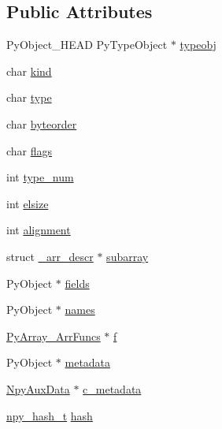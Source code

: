 \subsection*{Public Attributes}
\begin{DoxyCompactItemize}
\item 
Py\+Object\+\_\+\+H\+E\+AD Py\+Type\+Object $\ast$ \hyperlink{struct__PyArray__Descr_a1f3bf03c0bb4733e5a37164b05711433}{typeobj}
\item 
char \hyperlink{struct__PyArray__Descr_a3334dbcd62c0b82b746d78df163f5fe8}{kind}
\item 
char \hyperlink{struct__PyArray__Descr_a7fee62e125b41e0fdb9dec616ea724d4}{type}
\item 
char \hyperlink{struct__PyArray__Descr_a928bedd6abfdb662cc486eb459de8743}{byteorder}
\item 
char \hyperlink{struct__PyArray__Descr_a42b75d020f1e81c1e55aa784d922bb6c}{flags}
\item 
int \hyperlink{struct__PyArray__Descr_a8c77d1daf95cdb46a52b374e614d1e77}{type\+\_\+num}
\item 
int \hyperlink{struct__PyArray__Descr_a9426578c59c17b7dde397bc1d12110c8}{elsize}
\item 
int \hyperlink{struct__PyArray__Descr_a6395d1390bf5a63c117b2bd5bf11e6d6}{alignment}
\item 
struct \hyperlink{struct__arr__descr}{\+\_\+arr\+\_\+descr} $\ast$ \hyperlink{struct__PyArray__Descr_a9021d53dd883c3bb11608508d7296708}{subarray}
\item 
Py\+Object $\ast$ \hyperlink{struct__PyArray__Descr_a558c0b2fa6412603daee6749e69708ef}{fields}
\item 
Py\+Object $\ast$ \hyperlink{struct__PyArray__Descr_ac10e1b8a2d0cef9b10a1f5fd4ad38ee8}{names}
\item 
\hyperlink{structPyArray__ArrFuncs}{Py\+Array\+\_\+\+Arr\+Funcs} $\ast$ \hyperlink{struct__PyArray__Descr_a068d871788a00faee69393eaeb578c99}{f}
\item 
Py\+Object $\ast$ \hyperlink{struct__PyArray__Descr_a454d6ff258ddc021b355f05b7d18143b}{metadata}
\item 
\hyperlink{ndarraytypes_8h_a1f4020347b3c55cf6320697d1a3dca83}{Npy\+Aux\+Data} $\ast$ \hyperlink{struct__PyArray__Descr_ad155abc02ac1aab0026aafddc06662ce}{c\+\_\+metadata}
\item 
\hyperlink{npy__common_8h_a8e19510dec13243663db068bf658112c}{npy\+\_\+hash\+\_\+t} \hyperlink{struct__PyArray__Descr_a29c11870055f9b06527d941875ab6184}{hash}
\end{DoxyCompactItemize}



